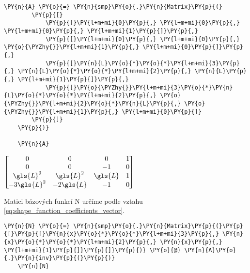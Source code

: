 \begin{tcolorbox}[breakable, size=fbox, boxrule=1pt, pad at break*=1mm,colback=cellbackground, colframe=cellborder]
    \begin{Verbatim}[commandchars=\\\{\}]
    \PY{n}{A} \PY{o}{=} \PY{n}{smp}\PY{o}{.}\PY{n}{Matrix}\PY{p}{(}
        \PY{p}{[}
            \PY{p}{[}\PY{l+m+mi}{0}\PY{p}{,} \PY{l+m+mi}{0}\PY{p}{,} \PY{l+m+mi}{0}\PY{p}{,} \PY{l+m+mi}{1}\PY{p}{]}\PY{p}{,}
            \PY{p}{[}\PY{l+m+mi}{0}\PY{p}{,} \PY{l+m+mi}{0}\PY{p}{,} \PY{o}{\PYZhy{}}\PY{l+m+mi}{1}\PY{p}{,} \PY{l+m+mi}{0}\PY{p}{]}\PY{p}{,}
            \PY{p}{[}\PY{n}{L}\PY{o}{*}\PY{o}{*}\PY{l+m+mi}{3}\PY{p}{,} \PY{n}{L}\PY{o}{*}\PY{o}{*}\PY{l+m+mi}{2}\PY{p}{,} \PY{n}{L}\PY{p}{,} \PY{l+m+mi}{1}\PY{p}{]}\PY{p}{,}
            \PY{p}{[}\PY{o}{\PYZhy{}}\PY{l+m+mi}{3}\PY{o}{*}\PY{n}{L}\PY{o}{*}\PY{o}{*}\PY{l+m+mi}{2}\PY{p}{,} \PY{o}{\PYZhy{}}\PY{l+m+mi}{2}\PY{o}{*}\PY{n}{L}\PY{p}{,} \PY{o}{\PYZhy{}}\PY{l+m+mi}{1}\PY{p}{,} \PY{l+m+mi}{0}\PY{p}{]}
        \PY{p}{]}
    \PY{p}{)}
    
    \PY{n}{A}
    \end{Verbatim}
\end{tcolorbox}
   
\newpage
                
    
    $\displaystyle \left[\begin{matrix}0 & 0 & 0 & 1\\0 & 0 & -1 & 0\\\gls{L}^{3} & \gls{L}^{2} & \gls{L} & 1\\- 3 \gls{L}^{2} & - 2 \gls{L} & -1 & 0\end{matrix}\right]$

\vspace{0.3cm}

Matici bázových funkcí \gls{N} určíme podle vztahu \ref{eq:shape_function_coefficients_vector}.

\begin{tcolorbox}[breakable, size=fbox, boxrule=1pt, pad at break*=1mm,colback=cellbackground, colframe=cellborder]
    \begin{Verbatim}[commandchars=\\\{\}]
    \PY{n}{N} \PY{o}{=} \PY{n}{smp}\PY{o}{.}\PY{n}{Matrix}\PY{p}{(}\PY{p}{[}\PY{p}{[}\PY{n}{x}\PY{o}{*}\PY{o}{*}\PY{l+m+mi}{3}\PY{p}{,} \PY{n}{x}\PY{o}{*}\PY{o}{*}\PY{l+m+mi}{2}\PY{p}{,} \PY{n}{x}\PY{p}{,} \PY{l+m+mi}{1}\PY{p}{]}\PY{p}{]}\PY{p}{)} \PY{o}{@} \PY{n}{A}\PY{o}{.}\PY{n}{inv}\PY{p}{(}\PY{p}{)}
    \PY{n}{N}
    \end{Verbatim}
\end{tcolorbox}
     

